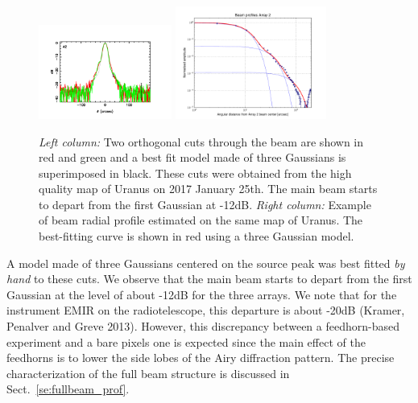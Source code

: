 \begin{figure}[ht!]
\begin{center}
    \includegraphics[clip=true, width=0.39\textwidth]{Figures/Array_A2_dB.pdf}
    \includegraphics[clip=true, trim={-0.5cm, -0.65cm, 0, 0}, width=0.44\textwidth]{Figures/Beam_profiles_A2_FR.pdf}
    \caption[Beam structure]{\emph{Left column:} Two orthogonal cuts through the
      beam are shown in red and green and a best fit model made of three
      Gaussians is superimposed in black.
      These cuts were obtained from the high quality map of Uranus on 2017
      January 25th. The main beam starts to depart from the first Gaussian
      at -12dB. \emph{Right column:} Example of beam radial profile
      estimated on the same map of Uranus. The best-fitting curve is shown
      in red using a three Gaussian model.   
    }
    \label{fig:beam_structure_example}
  \end{center}
\end{figure}

A model made of three Gaussians centered on the source peak was best
fitted {\it by hand} to these cuts.
We observe that the main beam starts to depart from the first
Gaussian at the level of about -12dB for the three arrays.
We note that for the instrument EMIR on the radiotelescope,
this departure is about -20dB (Kramer, Penalver and Greve
2013). However, this
discrepancy between a feedhorn-based experiment and a bare pixels one
is expected since the main effect of the feedhorns is to lower the
side lobes of the Airy diffraction pattern.
The precise characterization of the full beam structure is discussed
in Sect.~\ref{se:fullbeam_prof}.  

